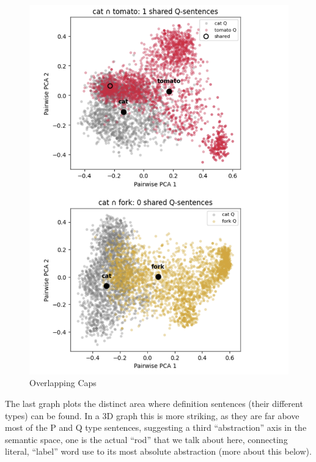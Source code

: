 \documentclass[12pt]{article}
\providecommand{\pandocbounded}[1]{#1}   %
\begin{document}
\begin{figure}
\centering
\pandocbounded{\includegraphics[keepaspectratio]{figures/caps.png}}
\caption{Overlapping Caps}
\end{figure}

The last graph plots the distinct area where definition sentences (their different types) can be found. In a 3D graph this is more striking, as they are far above most of the P and Q type sentences, suggesting a third ``abstraction'' axis in the semantic space, one is the actual ``rod'' that we talk about here, connecting literal, ``label'' word use to its most absolute abstraction (more about this below).
\end{document}
